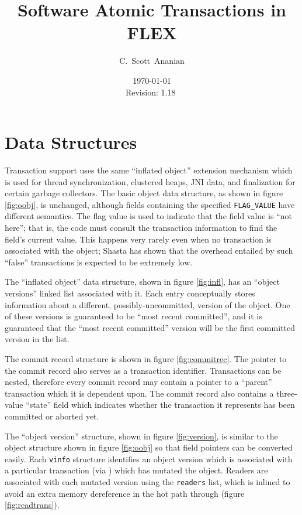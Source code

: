 \documentclass[11pt,notitlepage]{article}
\author{C.~Scott~Ananian}
\title{Software Atomic Transactions in FLEX}
\date{\today \\ $ $Revision: 1.18 $ $}
\begin{document}

\maketitle
\section{Data Structures}

Transaction support uses the same ``inflated object'' extension
mechanism which is used for thread synchronization, clustered heaps,
JNI data, and finalization for certain garbage collectors.
The basic object data structure, as shown in figure \ref{fig:oobj}, is
unchanged, although fields containing the specified
\texttt{FLAG\_VALUE} have different semantics.  The flag value is used
to indicate that the field value is ``not here''; that is, the code
must consult the transaction information to find the field's current
value.  This happens very rarely even when no transaction is
associated with the object; Shasta \cite{scales96:shasta} has shown that the
overhead entailed by such ``false'' transactions is expected to be
extremely low.

The ``inflated object'' data structure, shown in figure
\ref{fig:infl}, has an ``object versions'' linked list associated with
it.  Each entry conceptually stores information about a different,
possibly-uncommitted, version of the object.  One of these versions is
guaranteed to be ``most recent committed'', and it is guaranteed that
the ``most recent committed'' version will be the first committed
version in the list.

The commit record structure is shown in figure \ref{fig:commitrec}.
The pointer to the commit record also serves as a transaction
identifier.  Transactions can be nested, therefore every commit record
may contain a pointer to a ``parent'' transaction which it is
dependent upon.  The commit record also contains a three-value
``state'' field which indicates whether the transaction it represents
has been committed or aborted yet.

The ``object version'' structure, shown in figure
\ref{fig:version}, is similar to the object structure shown in
figure \ref{fig:oobj} so that field pointers can be converted easily.
Each \texttt{vinfo} structure identifies an object version which is
associated with a particular transaction (via ) which
has mutated the object.  Readers are associated with each mutated
version using the \texttt{readers} list, which is inlined to avoid an
extra memory dereference in the hot path through 
(figure \ref{fig:readtrans}).
\end{document}
